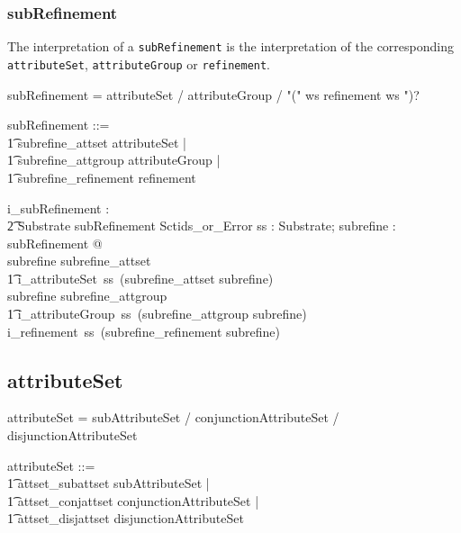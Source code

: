 \documentclass{article}
\def\spec#1{{\tt #1}}
\def\bnf#1{{\scriptsize {{#1}} }}
\begin{document}
\subsubsection{subRefinement}
The interpretation of a \spec{subRefinement} is the interpretation of the corresponding \spec{attributeSet}, \spec{attributeGroup} or \spec{refinement}.

\begin{framed}
\noindent
\bnf{subRefinement = attributeSet / attributeGroup / "(" ws refinement ws ")?}
\end{framed}

\begin{zed}
subRefinement ::= \\
\t1 subrefine\_attset \langle attributeSet \rangle | \\
\t1 subrefine\_attgroup \langle attributeGroup \rangle | \\
\t1 subrefine\_refinement \langle refinement \rangle
\end{zed}


\begin{gendef}
   i\_subRefinement : \\
\t2 Substrate \fun subRefinement \fun Sctids\_or\_Error
\where
   \forall ss : Substrate; subrefine : subRefinement @ \\
   \IF subrefine \in \ran subrefine\_attset \\
\t1 \THEN i\_attributeSet~ss~(subrefine\_attset \inv subrefine) \\
   \ELSE \IF subrefine \in \ran subrefine\_attgroup \\
\t1 \THEN i\_attributeGroup~ss~(subrefine\_attgroup \inv subrefine) \\
  \ELSE i\_refinement~ss~(subrefine\_refinement \inv subrefine)
\end{gendef}
\subsection{attributeSet}

\begin{framed}
\noindent
\bnf{attributeSet = subAttributeSet / conjunctionAttributeSet / disjunctionAttributeSet}
\end{framed}

\begin{zed}
attributeSet ::= \\
\t1 attset\_subattset \ldata subAttributeSet \rdata | \\
\t1 attset\_conjattset \ldata conjunctionAttributeSet \rdata | \\
\t1 attset\_disjattset \ldata disjunctionAttributeSet \rdata
\end{zed}
\end{document}

